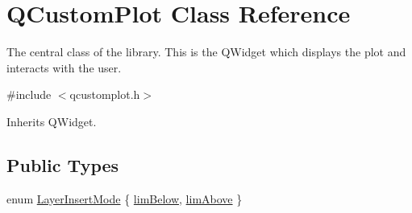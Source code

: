 \hypertarget{class_q_custom_plot}{\section{Q\-Custom\-Plot Class Reference}
\label{class_q_custom_plot}
}


The central class of the library. This is the Q\-Widget which displays the plot and interacts with the user.  




{\ttfamily \#include $<$qcustomplot.\-h$>$}



Inherits Q\-Widget.

\subsection*{Public Types}
\begin{DoxyCompactItemize}
\item 
enum \hyperlink{class_q_custom_plot_a75a8afbe6ef333b1f3d47abb25b9add7}{Layer\-Insert\-Mode} \{ \hyperlink{class_q_custom_plot_a75a8afbe6ef333b1f3d47abb25b9add7aee39cf650cd24e68552da0b697ce4a93}{lim\-Below}, 
\hyperlink{class_q_custom_plot_a75a8afbe6ef333b1f3d47abb25b9add7a062b0b7825650b432a713c0df6742d41}{lim\-Above}
 \}
\end{DoxyCompactItemize}
